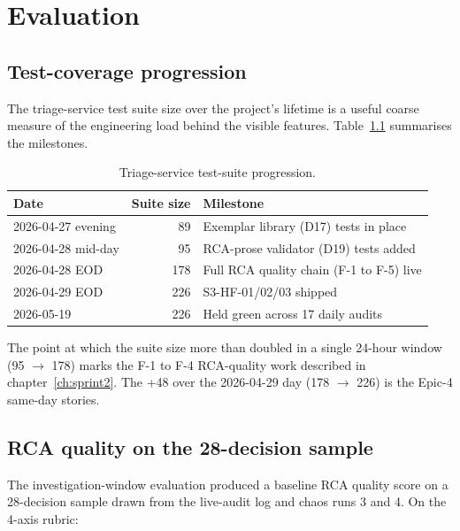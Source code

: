 \documentclass[11pt,a4paper,oneside]{report}
\begin{document}
\chapter{Evaluation}
\label{ch:evaluation}

\section{Test-coverage progression}

The triage-service test suite size over the project's lifetime is a
useful coarse measure of the engineering load behind the visible
features.  Table~\ref{tab:tests} summarises the milestones.

\begin{table}[h]
\centering
\small
\begin{tabular}{lrl}
\toprule
\textbf{Date} & \textbf{Suite size} & \textbf{Milestone} \\
\midrule
2026-04-27 evening & 89  & Exemplar library (D17) tests in place \\
2026-04-28 mid-day & 95  & RCA-prose validator (D19) tests added \\
2026-04-28 EOD    & 178 & Full RCA quality chain (F-1 to F-5) live \\
2026-04-29 EOD    & 226 & S3-HF-01/02/03 shipped \\
2026-05-19        & 226 & Held green across 17 daily audits \\
\bottomrule
\end{tabular}
\caption{Triage-service test-suite progression.}
\label{tab:tests}
\end{table}

The point at which the suite size more than doubled in a single
24-hour window (95 $\to$ 178) marks the F-1 to F-4 RCA-quality work
described in chapter~\ref{ch:sprint2}.  The +48 over the
2026-04-29 day (178 $\to$ 226) is the Epic-4 same-day stories.

\section{RCA quality on the 28-decision sample}

The investigation-window evaluation produced a baseline RCA quality
score on a 28-decision sample drawn from the live-audit log and
chaos runs 3 and 4.  On the 4-axis rubric:
\end{document}
